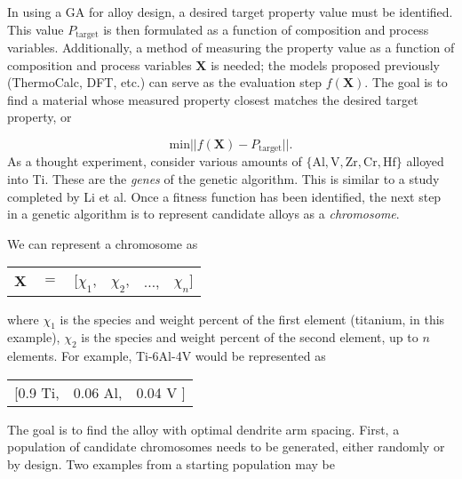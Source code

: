 In using a GA for alloy design, a desired target property value must be identified. This value $P_\text{target}$ is then formulated as a function of composition and process variables. Additionally, a method of measuring the property value as a function of composition and process variables $\mathbf{X}$ is needed; the models proposed previously (ThermoCalc, DFT, etc.) can serve as the evaluation step $f(\mathbf{X})$. The goal is to find a material whose measured property closest matches the desired target property, or

\begin{equation}
	\text{min} || f(\mathbf{X}) - P_\text{target} ||.
	\label{GAopt}
\end{equation}
As a thought experiment, consider various amounts of $\{\text{Al}, \text{V}, \text{Zr}, \text{Cr}, \text{Hf}\}$ alloyed into Ti. These are the \textit{genes} of the genetic algorithm. This is similar to a study completed by Li et al\cite{Li2017}. Once a fitness function has been identified, the next step in a genetic algorithm is to represent candidate alloys as a \textit{chromosome}. 

We can represent a chromosome as \\

\begin{table}[h!]
\begin{tabular}{cccccc}
	$\mathbf{X}$ & $=$ & [$\chi_1$, & $\chi_2$, & $\ldots$, & $\chi_n$] \\
\end{tabular}
\end{table}
\noindent 
where $\chi_1$ is the species and weight percent of the first element (titanium, in this example), $\chi_2$ is the species and weight percent of the second element, up to $n$ elements. For example, Ti-6Al-4V would be represented as \\

\begin{table}[h!]
\begin{tabular}{ccc}
	 [0.9 Ti,  & 0.06 Al, & 0.04 V ] \\
\end{tabular}
\end{table}
\noindent
The goal is to find the alloy with optimal dendrite arm spacing. First, a population of candidate chromosomes needs to be generated, either randomly or by design. Two examples from a starting population may be \\

